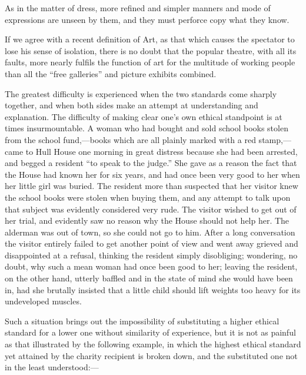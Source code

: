 \documentclass[]{article}
\begin{document}
\begin{sectionbody}
\addamsparagraph As in the matter of dress, more refined and simpler manners and mode of
expressions are unseen by them, and they must perforce copy what they
know.

\addamsparagraph If we agree with a recent definition of Art, as that which causes the
spectator to lose his sense of isolation, there is no doubt that the
popular theatre, with all its faults, more nearly fulfils the function
of art for the multitude of working people than all the ``free galleries''
and picture exhibits combined.

\addamsparagraph The greatest difficulty is experienced when the two standards come
sharply together, and when both sides make an attempt at understanding
and explanation. The difficulty of making clear one's own ethical
standpoint is at times insurmountable. A woman who had bought and sold
school books stolen from the school fund,---books which are all plainly
marked with a red stamp,---came to Hull House one morning in great
distress because she had been arrested, and begged a resident ``to speak
to the judge.'' She gave as a reason the fact that the House had known
her for six years, and had once been very good to her when her little
girl was buried. The resident more than suspected that her visitor knew
the school books were stolen when buying them, and any attempt to talk
upon that subject was evidently considered very rude. The visitor wished
to get out of her trial, and evidently saw no reason why the House
should not help her. The alderman was out of town, so she could not go
to him. After a long conversation the visitor entirely failed to get
another point of view and went away grieved and disappointed at a
refusal, thinking the resident simply disobliging; wondering, no doubt,
why such a mean woman had once been good to her; leaving the resident,
on the other hand, utterly baffled and in the state of mind she would
have been in, had she brutally insisted that a little child should lift
weights too heavy for its undeveloped muscles.

\addamsparagraph Such a situation brings out the impossibility of substituting a higher
ethical standard for a lower one without similarity of experience, but
it is not as painful as that illustrated by the following example, in
which the highest ethical standard yet attained by the charity recipient
is broken down, and the substituted one not in the least understood:---


\end{sectionbody}
\end{document}
